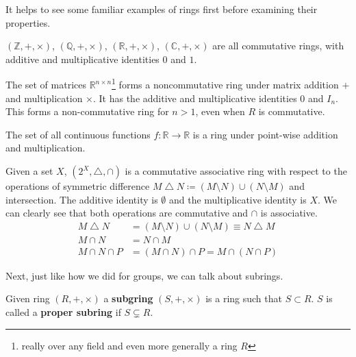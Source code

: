   It helps to see some familiar examples of rings first before examining their properties. 

  \begin{example}
    $(\mathbb{Z}, +, \times)$, $(\mathbb{Q}, +, \times)$, $(\mathbb{R}, +, \times)$, $(\mathbb{C}, +, \times)$ are all commutative rings, with additive and multiplicative identities $0$ and $1$. 
  \end{example}

  \begin{example}[Matrices]
    The set of matrices $\mathbb{R}^{n \times n}$\footnote{really over any field and even more generally a ring $R$} forms a noncommutative ring under matrix addition $+$ and multiplication $\times$. It has the additive and multiplicative identities $0$ and $I_{n}$. This forms a non-commutative ring for $n > 1$, even when $R$ is commutative.
  \end{example}

  \begin{example}
    The set of all continuous functions $f: \mathbb{R} \rightarrow \mathbb{R}$ is a ring under point-wise addition and multiplication. 
  \end{example}

  \begin{example}
    Given a set $X$, $(2^X, \bigtriangleup, \cap)$ is a commutative associative ring with respect to the operations of symmetric difference $M \bigtriangleup N \coloneqq (M \setminus N) \cup (N \setminus M)$ and intersection. The additive identity is $\emptyset$ and the multiplicative identity is $X$. We can clearly see that both operations are commutative and $\cap$ is associative. 
    \begin{align*}
      M \bigtriangleup N & = (M \setminus N) \cup (N \setminus M) \equiv N \bigtriangleup M \\
      M \cap N & = N \cap M \\
      M \cap N \cap P & = (M \cap N) \cap P = M \cap (N \cap P)
    \end{align*}
  \end{example}

  Next, just like how we did for groups, we can talk about subrings. 

  \begin{definition}[Subring]
    Given ring $(R, +, \times)$ a \textbf{subgring} $(S, +, \times)$ is a ring such that $S \subset R$. $S$ is called a \textbf{proper subring} if $S \subsetneq R$. 
  \end{definition}

